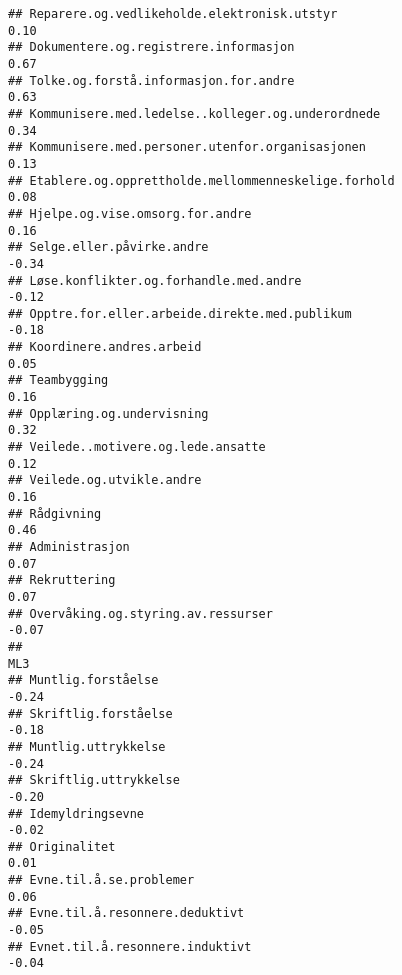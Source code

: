 \documentclass[
]{article}
\begin{document}
\begin{verbatim}
## Reparere.og.vedlikeholde.elektronisk.utstyr                                       0.10
## Dokumentere.og.registrere.informasjon                                             0.67
## Tolke.og.forstå.informasjon.for.andre                                             0.63
## Kommunisere.med.ledelse..kolleger.og.underordnede                                 0.34
## Kommunisere.med.personer.utenfor.organisasjonen                                   0.13
## Etablere.og.opprettholde.mellommenneskelige.forhold                               0.08
## Hjelpe.og.vise.omsorg.for.andre                                                   0.16
## Selge.eller.påvirke.andre                                                        -0.34
## Løse.konflikter.og.forhandle.med.andre                                           -0.12
## Opptre.for.eller.arbeide.direkte.med.publikum                                    -0.18
## Koordinere.andres.arbeid                                                          0.05
## Teambygging                                                                       0.16
## Opplæring.og.undervisning                                                         0.32
## Veilede..motivere.og.lede.ansatte                                                 0.12
## Veilede.og.utvikle.andre                                                          0.16
## Rådgivning                                                                        0.46
## Administrasjon                                                                    0.07
## Rekruttering                                                                      0.07
## Overvåking.og.styring.av.ressurser                                               -0.07
##                                                                                    ML3
## Muntlig.forståelse                                                               -0.24
## Skriftlig.forståelse                                                             -0.18
## Muntlig.uttrykkelse                                                              -0.24
## Skriftlig.uttrykkelse                                                            -0.20
## Idemyldringsevne                                                                 -0.02
## Originalitet                                                                      0.01
## Evne.til.å.se.problemer                                                           0.06
## Evne.til.å.resonnere.deduktivt                                                   -0.05
## Evnet.til.å.resonnere.induktivt                                                  -0.04

\end{verbatim}
\end{document}
